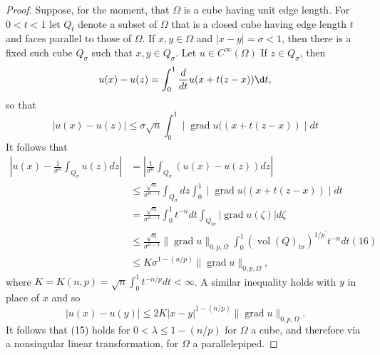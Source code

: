 \begin{proof}
  Suppose, for the moment, that $\Omega$ is a cube having unit edge length. For $0<t<1$ let $Q_t$ denote a subset of $\Omega$ that is a closed cube having edge length $t$ and faces parallel to those of $\Omega$. If $x, y \in \Omega$ and $|x-y|=\sigma<1$, then there is a fixed such cube $Q_\sigma$ such that $x, y \in Q_\sigma$.
  Let $u \in C^{\infty}(\Omega)$ If $z \in Q_\sigma$, then
  \[
  u(x)-u(z)=\int_0^1 \frac{d}{d t} u(x+t(z-x)) \d t,
  \]
  so that
  \[
  |u(x)-u(z)| \leq \sigma \sqrt{n} \int_0^1 \mid \operatorname{grad} u((x+t(z-x)) \mid d t
  \]
  It follows that
  \[
  \begin{aligned}
  \left|u(x)-\frac{1}{\sigma^n} \int_{Q_\sigma} u(z) d z\right| & =\left|\frac{1}{\sigma^n} \int_{Q_\sigma}(u(x)-u(z)) d z\right| \\
  & \leq \frac{\sqrt{n}}{\sigma^{n-1}} \int_{Q_\sigma} d z \int_0^1 \mid \operatorname{grad} u((x+t(z-x)) \mid d t \\
  & =\frac{\sqrt{n}}{\sigma^{n-1}} \int_0^1 t^{-n} d t \int_{Q_{t \sigma}}|\operatorname{grad} u(\zeta)| d \zeta \\
  & \leq \frac{\sqrt{n}}{\sigma^{n-1}}\|\operatorname{grad} u\|_{0, p, \Omega} \int_0^1\left(\operatorname{vol}(Q)_{t \sigma}\right)^{1 / p^{\prime}} t^{-n} d t(16) \\
  & \leq K \sigma^{1-(n / p)}\|\operatorname{grad} u\|_{0, p, \Omega},
  \end{aligned}
  \]
  where $K=K(n, p)=\sqrt{n} \int_0^1 t^{-n / p} d t<\infty$. A similar inequality holds with $y$ in place of $x$ and so
  \[
  |u(x)-u(y)| \leq 2 K|x-y|^{1-(n / p)}\|\operatorname{grad} u\|_{0, p, \Omega} .
  \]
  It follows that (15) holds for $0<\lambda \leq 1-(n / p)$ for $\Omega$ a cube, and therefore via a nonsingular linear transformation, for $\Omega$ a parallelepiped.
  

\end{proof}

